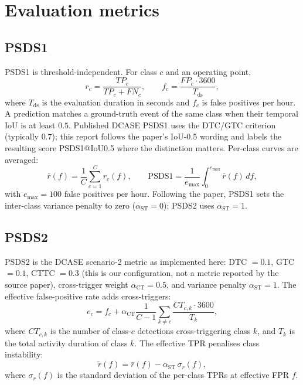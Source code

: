 \section{Evaluation metrics}

\subsection{PSDS1}
PSDS1 is threshold-independent. For class $c$ and an operating point,
\begin{equation}
r_c=\frac{TP_c}{TP_c+FN_c},
\qquad
f_c=\frac{FP_c\cdot 3600}{T_{\mathrm{ds}}},
\end{equation}
where $T_{\mathrm{ds}}$ is the evaluation duration in seconds and $f_c$ is false
positives per hour. A prediction matches a ground-truth event of the same class
when their temporal IoU is at least $0.5$. Published DCASE PSDS1 uses the
DTC/GTC criterion (typically $0.7$); this report follows the paper's IoU-0.5
wording and labels the resulting score PSDS1@IoU0.5 where the distinction
matters. Per-class curves are averaged:
\begin{equation}
\bar r(f)=\frac{1}{C}\sum_{c=1}^{C}r_c(f),
\qquad
\mathrm{PSDS1}
=
\frac{1}{e_{\max}}
\int_0^{e_{\max}}\bar r(f)\,df,
\end{equation}
with $e_{\max}=100$ false positives per hour. Following the paper, PSDS1 sets
the inter-class variance penalty to zero ($\alpha_{\mathrm{ST}}=0$); PSDS2 uses
$\alpha_{\mathrm{ST}}=1$.

\subsection{PSDS2}
PSDS2 is the DCASE scenario-2 metric as implemented here: DTC $=0.1$,
GTC $=0.1$, CTTC $=0.3$ (this is our configuration, not a metric reported by the
source paper),
cross-trigger weight $\alpha_{\mathrm{CT}}=0.5$, and variance penalty
$\alpha_{\mathrm{ST}}=1$. The effective false-positive rate adds cross-triggers:
\begin{equation}
e_c
=
f_c
+
\alpha_{\mathrm{CT}}
\frac{1}{C-1}
\sum_{k\ne c}
\frac{CT_{c,k}\cdot 3600}{T_k},
\end{equation}
where $CT_{c,k}$ is the number of class-$c$ detections cross-triggering class
$k$, and $T_k$ is the total activity duration of class $k$. The effective TPR
penalises class instability:
\begin{equation}
\tilde r(f)=\bar r(f)-\alpha_{\mathrm{ST}}\,\sigma_r(f),
\end{equation}
where $\sigma_r(f)$ is the standard deviation of the per-class TPRs at
effective FPR $f$.

